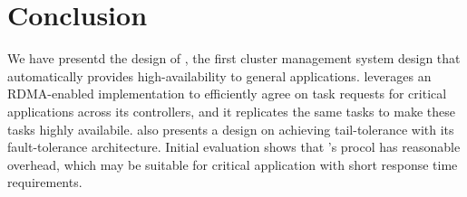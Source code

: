 \section{Conclusion} \label{sec:conclusion}

We have presentd the design of \xxx, the first cluster management system design 
that automatically provides high-availability to general applications. \xxx 
leverages an RDMA-enabled \paxos implementation to efficiently agree on task 
requests for critical applications across its controllers, and it replicates the 
same tasks to make these tasks highly availabile. \xxx also presents a design 
on achieving tail-tolerance with its fault-tolerance architecture. Initial 
evaluation shows that \xxx's procol has reasonable overhead, which may be 
suitable for critical application with short response time requirements. 

